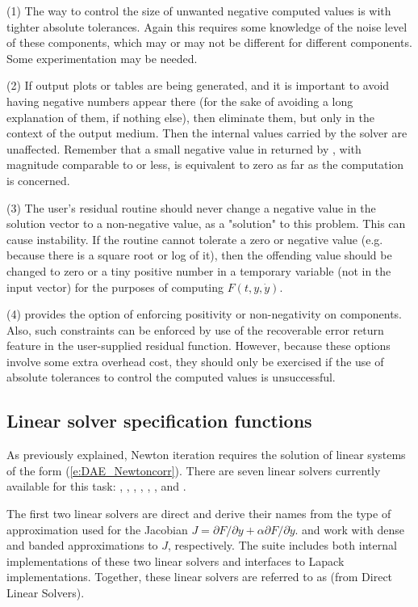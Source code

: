 (1) The way to control the size of unwanted negative computed values
is with tighter absolute tolerances.  Again this requires some
knowledge of the noise level of these components, which may or may not
be different for different components.  Some experimentation may be
needed.

(2) If output plots or tables are being generated, and it is important
to avoid having negative numbers appear there (for the sake of avoiding
a long explanation of them, if nothing else), then eliminate them, but
only in the context of the output medium.  Then the internal values carried
by the solver are unaffected.  Remember that a small negative value in 
returned by {\ida}, with magnitude comparable to  or less,
is equivalent to zero as far as the computation is concerned.

(3) The user's residual routine  should never change a
negative value in the solution vector  to a non-negative value,
as a "solution" to this problem.  This can cause instability.  If the
 routine cannot tolerate a zero or negative value (e.g. because
there is a square root or log of it), then the offending value should
be changed to zero or a tiny positive number in a temporary variable
(not in the input  vector) for the purposes of computing $F(t,y,\dot{y})$.

(4) {\ida} provides the option of enforcing positivity or non-negativity
on components.  Also, such constraints can be enforced by use of the
recoverable error return feature in the user-supplied residual function.
However, because these options involve some extra overhead cost, they
should only be exercised if the use of absolute tolerances to control
the computed values is unsuccessful.
\subsection{Linear solver specification functions}\label{sss:lin_solv_init}

As previously explained, Newton iteration requires the solution of
linear systems of the form (\ref{e:DAE_Newtoncorr}).  There are seven {\ida} linear
solvers currently available for this task: {\idadense}, {\idaband},
{\idaklu}, {\idasuperlumt}, {\idaspgmr}, {\idaspbcg}, and {\idasptfqmr}.

The first two linear solvers are direct and derive their
names from the type of approximation used for the Jacobian 
$J = \partial{F}/\partial{y} + \alpha \partial{F}/\partial{\dot{y}}$.
{\idadense} and {\idaband} work with dense and banded approximations to $J$,
respectively. The {\sundials} suite includes both internal implementations of
these two linear solvers and interfaces to Lapack implementations.
Together, these linear solvers are referred to as {\idadls} (from Direct
Linear Solvers).

